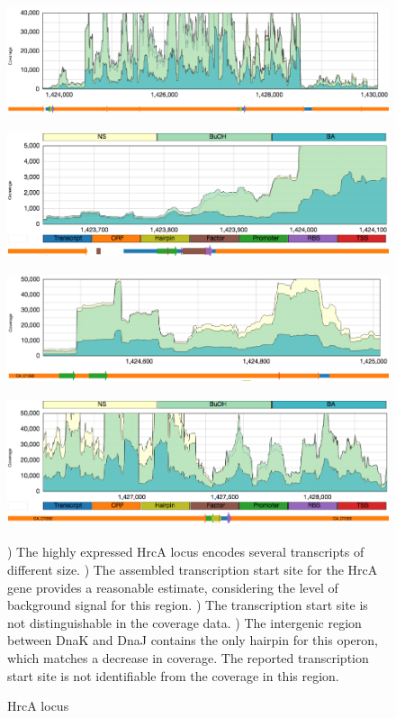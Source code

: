 \begin{figure}
\small
{\includegraphics[width=\textwidth,height=1.5in]{images/Assembly/Examples/HrcA/HrcA-locus.png}
\label{fig:7a}}
{\includegraphics[width=\textwidth,height=1.5in]{images/Assembly/Examples/HrcA/HrcA-TSS.png}
\label{fig:7b}}
{\includegraphics[width=\textwidth,height=1.5in]{images/Assembly/Examples/HrcA/GrpE-TSS.png}
\label{fig:7c}}
{\includegraphics[width=\textwidth,height=1.5in]{images/Assembly/Examples/HrcA/DnaKJ-IGR.png}
\label{fig:7d}}
\caption{HrcA locus}
) The highly expressed HrcA locus encodes several transcripts of different size. ) The assembled transcription start site for the HrcA gene provides a reasonable estimate, considering the level of background signal for this region. ) The transcription start site is not distinguishable in the coverage data. ) The intergenic region between DnaK and DnaJ contains the only hairpin for this operon, which matches a decrease in coverage. The reported transcription start site is not identifiable from the coverage in this region.
\end{figure}

